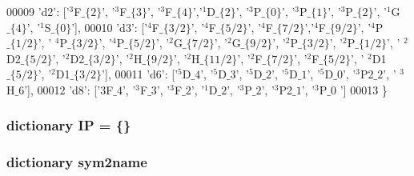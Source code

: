 \begin{DoxyCode}
00009             \textcolor{stringliteral}{'d2'}: [\textcolor{stringliteral}{'$^3$F$\_\{2\}$'}, \textcolor{stringliteral}{'$^3$F$\_\{3\}$'}, \textcolor{stringliteral}{'$^3$F$\_\{4\}$'},\textcolor{stringliteral}{'$^1$D$\_\{2\}$'}, \textcolor{stringliteral}{'$^3$P$\_\{0\}$'}, \textcolor{stringliteral}{'$^3$P$\_\{1\}$'},
       \textcolor{stringliteral}{'$^3$P$\_\{2\}$'}, \textcolor{stringliteral}{'$^1$G$\_\{4\}$'}, \textcolor{stringliteral}{'$^1$S$\_\{0\}$'}], 
00010             \textcolor{stringliteral}{'d3'}: [\textcolor{stringliteral}{'$^4$F$\_\{3/2\}$'}, \textcolor{stringliteral}{'$^4$F$\_\{5/2\}$'}, \textcolor{stringliteral}{'$^4$F$\_\{7/2\}$'},\textcolor{stringliteral}{'$^4$F$\_\{9/2\}$'}, \textcolor{stringliteral}{'$^4$P$\_\{1/2\}$'}, \textcolor{stringliteral}{'
      $^4$P$\_\{3/2\}$'}, \textcolor{stringliteral}{'$^4$P$\_\{5/2\}$'}, \textcolor{stringliteral}{'$^2$G$\_\{7/2\}$'}, \textcolor{stringliteral}{'$^2$G$\_\{9/2\}$'}, \textcolor{stringliteral}{'$^2$P$\_\{3/2\}$'}, \textcolor{stringliteral}{'$^2$P$\_\{1/2\}$'}, \textcolor{stringliteral}{'
      $^2$D2$\_\{5/2\}$'}, \textcolor{stringliteral}{'$^2$D2$\_\{3/2\}$'}, \textcolor{stringliteral}{'$^2$H$\_\{9/2\}$'}, \textcolor{stringliteral}{'$^2$H$\_\{11/2\}$'}, \textcolor{stringliteral}{'$^2$F$\_\{7/2\}$'}, \textcolor{stringliteral}{'$^2$F$\_\{5/2\}$'}, \textcolor{stringliteral}{'
      $^2$D1$\_\{5/2\}$'}, \textcolor{stringliteral}{'$^2$D1$\_\{3/2\}$'}], 
00011             \textcolor{stringliteral}{'d6'}: [\textcolor{stringliteral}{'$^5$D$\_4$'}, \textcolor{stringliteral}{'$^5$D$\_3$'}, \textcolor{stringliteral}{'$^5$D$\_2$'}, \textcolor{stringliteral}{'$^5$D$\_1$'}, \textcolor{stringliteral}{'$^5$D$\_0$'}, \textcolor{stringliteral}{'$^3$P2$\_2$'}, \textcolor{stringliteral}{'
      $^3$H$\_6$'}], 
00012             \textcolor{stringliteral}{'d8'}: [\textcolor{stringliteral}{'$3$F$\_4$'}, \textcolor{stringliteral}{'$^3$F$\_3$'}, \textcolor{stringliteral}{'$^3$F$\_2$'}, \textcolor{stringliteral}{'$^1$D$\_2$'}, \textcolor{stringliteral}{'$^3$P$\_2$'}, \textcolor{stringliteral}{'$^3$P2$\_1$'}, \textcolor{stringliteral}{'$^3$P$\_0$
      '}]
00013             \}
\end{DoxyCode}
\hypertarget{namespacepyneb_1_1utils_1_1physics_a98382f08784fe7d142ec0758017c4117}{}
\subsubsection[{I\+P}]{\setlength{\rightskip}{0pt plus 5cm}dictionary I\+P = \{\}}\label{namespacepyneb_1_1utils_1_1physics_a98382f08784fe7d142ec0758017c4117}
\hypertarget{namespacepyneb_1_1utils_1_1physics_a9d07f39b9983e7918a815f905b0a6de1}{}
\subsubsection[{sym2name}]{\setlength{\rightskip}{0pt plus 5cm}dictionary sym2name}\label{namespacepyneb_1_1utils_1_1physics_a9d07f39b9983e7918a815f905b0a6de1}
